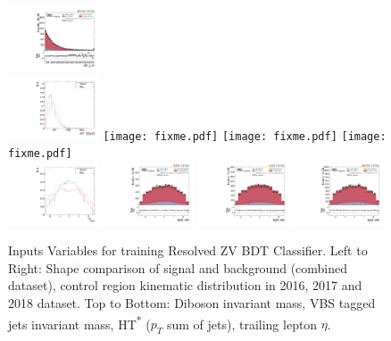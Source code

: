 \begin{figure}[!ht]
  \includegraphics[width=0.24\textwidth]{analysis_plots/2018_zjj/cr_vjets_l/vbf_jj_m.pdf}\\
  \includegraphics[width=0.24\textwidth]{analysis_plots/tmva_plots/zjj_BDTG14_ht_resolved.pdf}
  \texttt{[image: fixme.pdf]}
  \texttt{[image: fixme.pdf]}
  \texttt{[image: fixme.pdf]}\\
  \includegraphics[width=0.24\textwidth]{analysis_plots/tmva_plots/zjj_BDTG14_lep2_eta.pdf}
  \includegraphics[width=0.24\textwidth]{analysis_plots/2016_zjj/cr_vjets_l/lep2_eta.pdf}
  \includegraphics[width=0.24\textwidth]{analysis_plots/2017_zjj/cr_vjets_l/lep2_eta.pdf}
  \includegraphics[width=0.24\textwidth]{analysis_plots/2018_zjj/cr_vjets_l/lep2_eta.pdf}
  \caption[Inputs Variables for training Resolved ZV BDT Classifier]%
  {Inputs Variables for training Resolved ZV BDT Classifier.
    Left to Right: Shape comparison of signal and background (combined dataset), control region
    kinematic distribution in 2016, 2017 and 2018 dataset.
    Top to Bottom: Diboson invariant mass, VBS tagged jets invariant mass,
    HT\textsuperscript{*} (\( p_{T} \) sum of jets), trailing lepton \( \eta \).}%
  \label{fig:vbs-training-input-zjj}
\end{figure}

